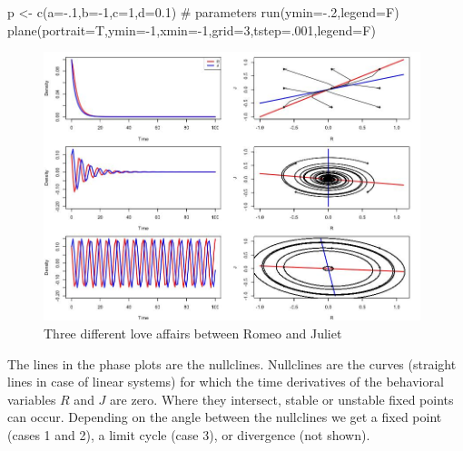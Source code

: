 \documentclass[
  letterpaper,
]{scrbook}
\newenvironment{Shaded}{\begin{snugshade}}{\end{snugshade}}
\newcommand{\AttributeTok}[1]{\textcolor[rgb]{0.40,0.45,0.13}{#1}}
\newcommand{\CommentTok}[1]{\textcolor[rgb]{0.37,0.37,0.37}{#1}}
\newcommand{\DecValTok}[1]{\textcolor[rgb]{0.68,0.00,0.00}{#1}}
\newcommand{\FloatTok}[1]{\textcolor[rgb]{0.68,0.00,0.00}{#1}}
\newcommand{\FunctionTok}[1]{\textcolor[rgb]{0.28,0.35,0.67}{#1}}
\newcommand{\NormalTok}[1]{\textcolor[rgb]{0.00,0.23,0.31}{#1}}
\newcommand{\OtherTok}[1]{\textcolor[rgb]{0.00,0.23,0.31}{#1}}
\newcommand{\SpecialCharTok}[1]{\textcolor[rgb]{0.37,0.37,0.37}{#1}}
\begin{document}
\begin{Shaded}
\begin{Highlighting}[]
\NormalTok{p }\OtherTok{\textless{}{-}} \FunctionTok{c}\NormalTok{(}\AttributeTok{a=}\SpecialCharTok{{-}}\NormalTok{.}\DecValTok{1}\NormalTok{,}\AttributeTok{b=}\SpecialCharTok{{-}}\DecValTok{1}\NormalTok{,}\AttributeTok{c=}\DecValTok{1}\NormalTok{,}\AttributeTok{d=}\FloatTok{0.1}\NormalTok{) }\CommentTok{\# parameters}
\FunctionTok{run}\NormalTok{(}\AttributeTok{ymin=}\SpecialCharTok{{-}}\NormalTok{.}\DecValTok{2}\NormalTok{,}\AttributeTok{legend=}\NormalTok{F)}
\FunctionTok{plane}\NormalTok{(}\AttributeTok{portrait=}\NormalTok{T,}\AttributeTok{ymin=}\SpecialCharTok{{-}}\DecValTok{1}\NormalTok{,}\AttributeTok{xmin=}\SpecialCharTok{{-}}\DecValTok{1}\NormalTok{,}\AttributeTok{grid=}\DecValTok{3}\NormalTok{,}\AttributeTok{tstep=}\NormalTok{.}\DecValTok{001}\NormalTok{,}\AttributeTok{legend=}\NormalTok{F)}
\end{Highlighting}
\end{Shaded}

\begin{figure}

{\centering \includegraphics[width=4.32779in,height=\textheight]{media/ch5/image9.jpg}

}

\caption{\label{fig-ch5-img9-old-57}Three different love affairs between
Romeo and Juliet}

\end{figure}

The lines in the phase plots are the nullclines. Nullclines are the
curves (straight lines in case of linear systems) for which the time
derivatives of the behavioral variables \(R\) and \(J\) are zero. Where
they intersect, stable or unstable fixed points can occur. Depending on
the angle between the nullclines we get a fixed point (cases 1 and 2), a
limit cycle (case 3), or divergence (not shown).
\end{document}
